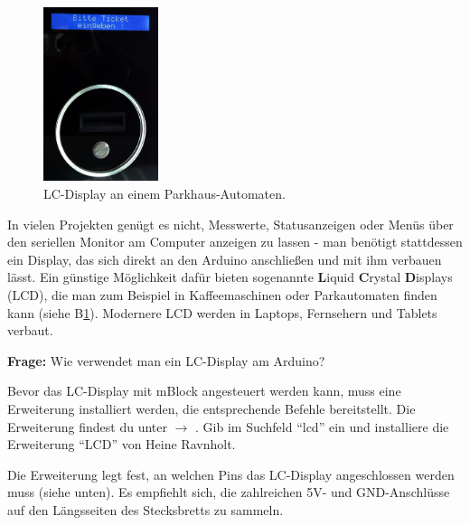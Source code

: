 \begin{figure}
	\centering
	\includegraphics[width=0.3\textwidth]{./pics/lcd-im-parkhaus-v2.png}
	\caption{LC-Display an einem Parkhaus-Automaten.}
	\label{abb:lcd-parkhaus}
	\vspace{-2\baselineskip}
\end{figure}
In vielen Projekten genügt es nicht, Messwerte, Statusanzeigen oder Menüs über den seriellen Monitor am Computer anzeigen zu lassen - man benötigt stattdessen ein Display, das sich direkt an den Arduino anschließen und mit ihm verbauen lässt. Ein günstige Möglichkeit dafür bieten sogenannte \textbf{L}iquid \textbf{C}rystal \textbf{D}isplays (LCD), die man zum Beispiel in Kaffeemaschinen oder Parkautomaten finden kann (siehe B\ref{abb:lcd-parkhaus}). Modernere LCD werden in Laptops, Fernsehern und Tablets verbaut.

\begin{ziel}
	\textbf{Frage:} Wie verwendet man ein LC-Display am Arduino?
\end{ziel}

Bevor das LC-Display mit mBlock angesteuert werden kann, muss eine Erweiterung installiert werden, die entsprechende Befehle bereitstellt. Die Erweiterung findest du unter  $\rightarrow$ . Gib im Suchfeld \enquote{lcd} ein und installiere die Erweiterung \enquote{LCD} von Heine Ravnholt.

Die Erweiterung legt fest, an welchen Pins das LC-Display angeschlossen werden muss (siehe unten). Es empfiehlt sich, die zahlreichen 5V- und GND-Anschlüsse auf den Längsseiten des Stecksbretts zu sammeln.

